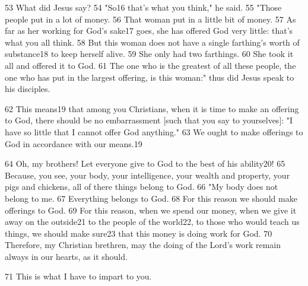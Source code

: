 53 What did Jesus say? 54 "So16 that's what you think," he said.
55 "Those people put in a lot of money. 56 That woman put in a little
bit of money. 57 As far as her working for God's sake17 goes, she has offered God
very little: that's what you all think. 58 But this woman does not have a single
farthing's worth of substance18 to keep herself alive. 59 She only had two farthings.
60 She took it all and offered it to God. 61 The one who is the greatest of all
these people, the one who has put in the largest offering, is this woman:"
thus did Jesus speak to his disciples.

62 This means19 that among you Christians, when it is time to make an offering
to God, there should be no embarrassment [such that you say to yourselves]: "I
have so little that I cannot offer God anything." 63 We ought to make
offerings to God in accordance with our means.19

64 Oh, my brothers! Let everyone give to God to the best of his ability20! 65 Because,
you see, your body, your intelligence, your wealth and property, your pigs and
chickens, all of there things belong to God. 66 "My body does not belong
to me. 67 Everything belongs to God. 68 For this reason we should make offerings
to God. 69 For this reason, when we spend our money, when we give it away on the
outside21 to the people of the world22, to those who would teach us things, we
should make sure23 that this money is doing work for God. 70 Therefore, my Christian
brethren, may the doing of the Lord's work remain always in our hearts, as it should.

71 This is what I have to impart to you.

